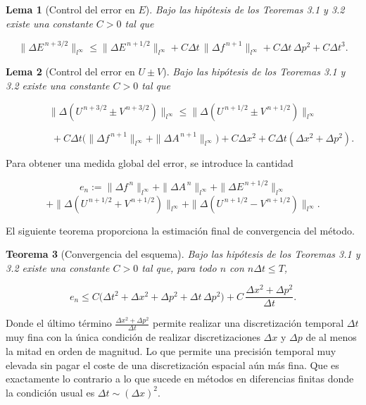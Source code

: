 \documentclass[11pt,a4paper,twoside,pdf]{article}
\numberwithin{equation}{section}
\newtheorem{theorem}{Teorema}[section]
\newtheorem{lemma}[theorem]{Lema}
\begin{document}
\begin{lemma}[Control del error en $E$]
Bajo las hipótesis de los Teoremas 3.1 y 3.2 existe una constante $C>0$ tal que


\[
\|\Delta E^{\,n+3/2}\|_{l^\infty}
\le \|\Delta E^{\,n+1/2}\|_{l^\infty}
+ C\Delta t\,\|\Delta f^{\,n+1}\|_{l^\infty}
+ C\Delta t\,\Delta p^2
+ C\Delta t^3.
\]


\end{lemma}


\begin{lemma}[Control del error en $U\pm V$]
Bajo las hipótesis de los Teoremas 3.1 y 3.2 existe una constante
$C>0$ tal que


\[
\|\Delta(U^{\,n+3/2} \pm V^{\,n+3/2})\|_{l^\infty}
\le
\|\Delta(U^{\,n+1/2} \pm V^{\,n+1/2})\|_{l^\infty}
\]




\[
\qquad\qquad
+ C\Delta t\big(\|\Delta f^{\,n+1}\|_{l^\infty}
+ \|\Delta A^{\,n+1}\|_{l^\infty}\big)
+ C\Delta x^2
+ C\Delta t(\Delta x^2 + \Delta p^2).
\]


\end{lemma}



Para obtener una medida global del error, se introduce la cantidad


\[
e_n := 
\|\Delta f^{\,n}\|_{l^\infty}
+ \|\Delta A^{\,n}\|_{l^\infty}
+ \|\Delta E^{\,n+1/2}\|_{l^\infty}
\]
\[
+ \|\Delta(U^{\,n+1/2}+V^{\,n+1/2})\|_{l^\infty}
+ \|\Delta(U^{\,n+1/2}-V^{\,n+1/2})\|_{l^\infty}.
\]



El siguiente teorema proporciona la estimación final de convergencia del método.

\begin{theorem}[Convergencia del esquema]
Bajo las hipótesis de los Teoremas 3.1 y 3.2 existe una constante
$C>0$ tal que, para todo $n$ con $n\Delta t\le T$,


\[
e_n \le
C\big(\Delta t^2 + \Delta x^2 + \Delta p^2 + \Delta t\,\Delta p^2\big)
+ C\,\frac{\Delta x^2 + \Delta p^2}{\Delta t}.
\]


\end{theorem}


Donde el último término $\frac{\Delta x^2 + \Delta p^2}{\Delta t}$ permite realizar una discretización temporal $\Delta t$ muy fina con la única condición de realizar discretizaciones $\Delta x$ y $\Delta p$ de al menos la mitad en orden de magnitud. Lo que permite una precisión temporal muy elevada sin pagar el coste de una discretización espacial aún más fina. Que es exactamente lo contrario a lo que sucede en métodos en diferencias finitas donde la condición usual es $\Delta t \sim \left( \Delta x \right)^2$.
\end{document}
